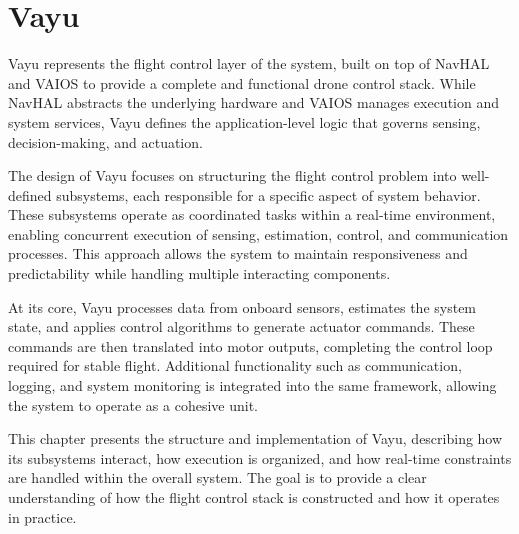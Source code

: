 \chapter{Vayu}
\label{chap:vayu}

Vayu represents the flight control layer of the system, built on top of NavHAL and VAIOS to provide a complete and functional drone control stack. While NavHAL abstracts the underlying hardware and VAIOS manages execution and system services, Vayu defines the application-level logic that governs sensing, decision-making, and actuation.

The design of Vayu focuses on structuring the flight control problem into well-defined subsystems, each responsible for a specific aspect of system behavior. These subsystems operate as coordinated tasks within a real-time environment, enabling concurrent execution of sensing, estimation, control, and communication processes. This approach allows the system to maintain responsiveness and predictability while handling multiple interacting components.

At its core, Vayu processes data from onboard sensors, estimates the system state, and applies control algorithms to generate actuator commands. These commands are then translated into motor outputs, completing the control loop required for stable flight. Additional functionality such as communication, logging, and system monitoring is integrated into the same framework, allowing the system to operate as a cohesive unit.

This chapter presents the structure and implementation of Vayu, describing how its subsystems interact, how execution is organized, and how real-time constraints are handled within the overall system. The goal is to provide a clear understanding of how the flight control stack is constructed and how it operates in practice.














